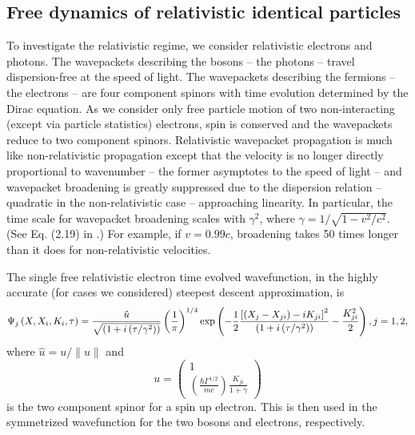 \documentclass[preprint,aps]{revtex4}
\begin{document}
\subsection{\protect\bigskip Free dynamics of relativistic identical particles}

To investigate the relativistic regime, we consider relativistic electrons and photons.  The wavepackets describing the bosons -- the photons -- travel dispersion-free at the speed of light.  The wavepackets describing the fermions -- the electrons -- are four component spinors with time evolution determined by the Dirac equation.  As we consider only free particle motion of two non-interacting (except via particle statistics) electrons, spin is conserved and the wavepackets reduce to two component spinors.  Relativistic wavepacket propagation is much like non-relativistic propagation except that the velocity is no longer directly proportional to wavenumber -- the former asymptotes to the speed of light -- and wavepacket broadening is greatly suppressed due to the dispersion relation -- quadratic in the non-relativistic case -- approaching linearity.  In particular, the time scale for wavepacket broadening scales with $\gamma^2$, where  $\gamma = 1/\sqrt{1-v^2/c^2}$. (See Eq. (2.19) in \cite{dumont2020}.)  For example, if $v=0.99c$, broadening takes 50 times longer than it does for non-relativistic velocities.

The single free relativistic electron time evolved wavefunction, in the highly accurate (for cases we considered) steepest descent approximation, is
\begin{equation}
\Psi _{j}\left( X,X_{i},K_{i},\tau \right) =\frac{\hat{u}}{\sqrt{\left( 1+i\left(\tau/\gamma^2 \right)
\right) }}\left( \frac{1}{\pi }\right) ^{1/4}\exp \left( -\frac{1}{2}\frac{%
\left[ \left( X_{j}-X_{ji}\right) -iK_{ji}\right] ^{2}}{\left( 1+i\left(\tau/\gamma^2 \right)
\right) }-\frac{K_{ji}^{2}}{2}\right) ,j=1,2,  \label{3.1}
\end{equation}%
where $\hat{u}=u/\lVert u \rVert$ and
\begin{equation}
u=\left(
\begin{array}{c}
1 \\
\left(\frac{\hbar \Gamma^{1/2}}{mc} \right) \frac{K_{ji}}{1+\gamma}
\end{array}%
\right)
\end{equation}
is the two component spinor for a spin up electron. This is then used in the symmetrized wavefunction for the two bosons and electrons, respectively. 
\end{document}
